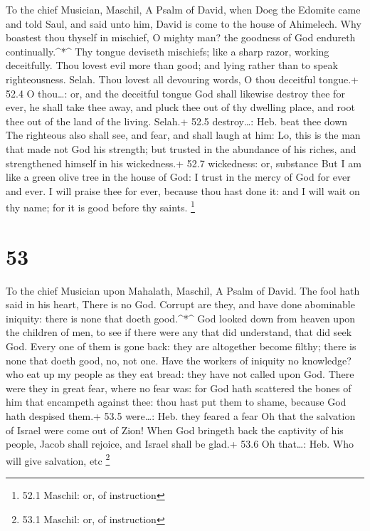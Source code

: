 To the chief Musician, Maschil, A Psalm of David, when Doeg the Edomite
came and told Saul, and said unto him, David is come to the house of
Ahimelech.  Why boastest thou thyself in mischief, O mighty
man? the goodness of God endureth continually.\^{}*\^{}  Thy
tongue deviseth mischiefs; like a sharp razor, working deceitfully.
 Thou lovest evil more than good; and lying rather than to
speak righteousness. Selah.  Thou lovest all devouring
words, O thou deceitful tongue.+ 52.4 O thou\ldots: or, and the
deceitful tongue  God shall likewise destroy thee for ever,
he shall take thee away, and pluck thee out of thy dwelling place, and
root thee out of the land of the living. Selah.+ 52.5 destroy\ldots:
Heb. beat thee down  The righteous also shall see, and fear,
and shall laugh at him:  Lo, this is the man that made not
God his strength; but trusted in the abundance of his riches, and
strengthened himself in his wickedness.+ 52.7 wickedness: or, substance
 But I am like a green olive tree in the house of God: I
trust in the mercy of God for ever and ever.  I will praise
thee for ever, because thou hast done it: and I will wait on thy name;
for it is good before thy saints. \footnote{52.1 Maschil: or, of
  instruction}

\hypertarget{section-52}{%
\section{53}\label{section-52}}

To the chief Musician upon Mahalath, Maschil, A Psalm of David.
 The fool hath said in his heart, There is no God. Corrupt
are they, and have done abominable iniquity: there is none that doeth
good.\^{}*\^{}  God looked down from heaven upon the
children of men, to see if there were any that did understand, that did
seek God.  Every one of them is gone back: they are
altogether become filthy; there is none that doeth good, no, not one.
 Have the workers of iniquity no knowledge? who eat up my
people as they eat bread: they have not called upon God. 
There were they in great fear, where no fear was: for God hath scattered
the bones of him that encampeth against thee: thou hast put them to
shame, because God hath despised them.+ 53.5 were\ldots: Heb. they
feared a fear  Oh that the salvation of Israel were come out
of Zion! When God bringeth back the captivity of his people, Jacob shall
rejoice, and Israel shall be glad.+ 53.6 Oh that\ldots: Heb. Who will
give salvation, etc \footnote{53.1 Maschil: or, of instruction}

